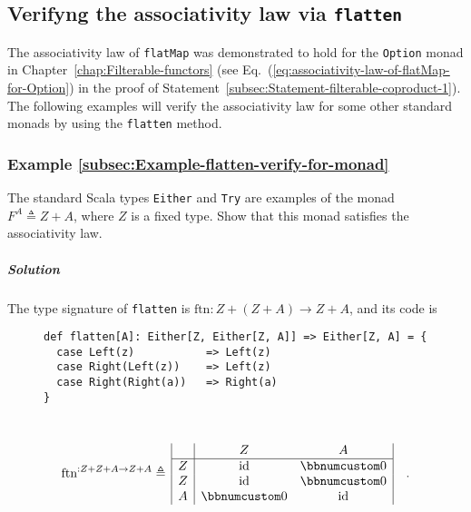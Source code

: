 \subsection{Verifyng the associativity law via \texttt{flatten}}

The associativity law of \lstinline!flatMap! was demonstrated to
hold for the \lstinline!Option! monad in Chapter~\ref{chap:Filterable-functors}
(see Eq.~(\ref{eq:associativity-law-of-flatMap-for-Option}) in the
proof of Statement~\ref{subsec:Statement-filterable-coproduct-1}).
The following examples will verify the associativity law for some
other standard monads by using the \lstinline!flatten! method.

\subsubsection{Example \label{subsec:Example-flatten-verify-for-monad}\ref{subsec:Example-flatten-verify-for-monad}}

The standard Scala types \lstinline!Either! and \lstinline!Try!
are examples of the monad $F^{A}\triangleq Z+A$, where $Z$ is a
fixed type. Show that this monad satisfies the associativity law.

\subparagraph{Solution}

The type signature of \lstinline!flatten! is $\text{ftn}:Z+\left(Z+A\right)\rightarrow Z+A$,
and its code is

\begin{wrapfigure}{l}{0.6\columnwidth}%
\vspace{-0.2\baselineskip}
\begin{lstlisting}
def flatten[A]: Either[Z, Either[Z, A]] => Either[Z, A] = {
  case Left(z)           => Left(z)
  case Right(Left(z))    => Left(z)
  case Right(Right(a))   => Right(a)
}
\end{lstlisting}

\vspace{-3.2\baselineskip}
\end{wrapfigure}%

~\vspace{-0.6\baselineskip}
\[
\text{ftn}^{:Z+Z+A\rightarrow Z+A}\triangleq\,\begin{array}{|c|cc|}
 & Z & A\\
\hline Z & \text{id} & \bbnum 0\\
Z & \text{id} & \bbnum 0\\
A & \bbnum 0 & \text{id}
\end{array}\quad.
\]

